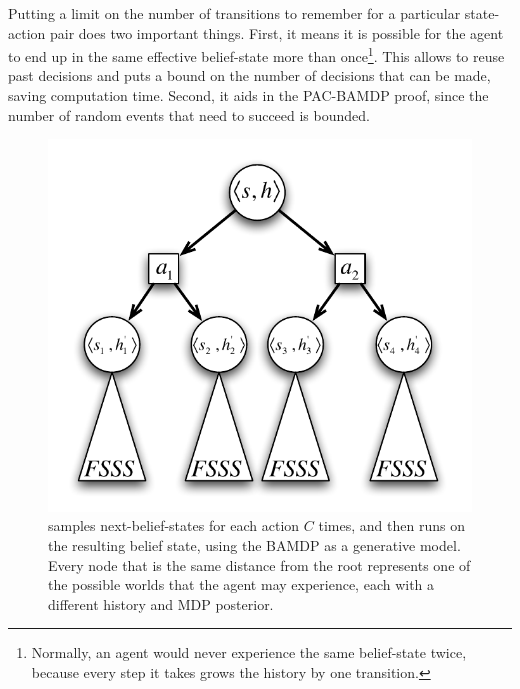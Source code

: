 Putting a limit on the number of transitions to remember for a particular state-action pair does two important things. First, it means it is possible for the agent to end up in the same effective belief-state more than once\footnote{Normally, an agent would never experience the same belief-state twice, because every step it takes grows the history by one transition.}. This allows  to reuse past decisions and puts a bound on the number of decisions that can be made, saving computation time. Second, it aids in the PAC-BAMDP proof, since the number of random events that need to succeed is bounded.

\begin{figure}
\vskip 0.2in
\begin{center}
\centerline{\includegraphics[scale=0.5]{figures/bfs3}}
\caption{
 samples next-belief-states for each action $C$ times, and then runs  on the resulting belief state, using the BAMDP as a generative model. Every node that is the same distance from the root represents one of the possible worlds that the agent may experience, each with a different history and MDP posterior.
}
\label{fig:bfs3}
\end{center}
\vskip -0.2in
\end{figure} 

